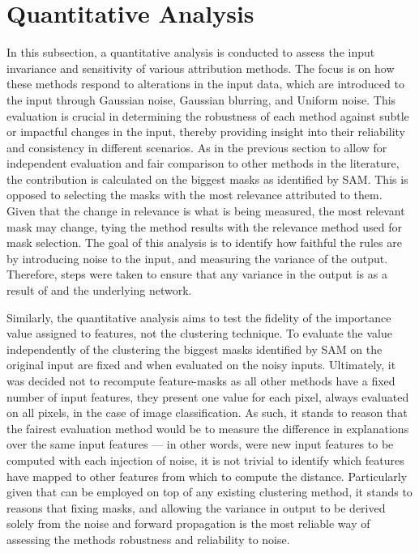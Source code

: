 \section{Quantitative Analysis}
In this subsection, a quantitative analysis is conducted to assess the input invariance and sensitivity of various attribution methods. The focus is on how these methods respond to alterations in the input data, which are introduced to the input through Gaussian noise, Gaussian blurring, and Uniform noise. This evaluation is crucial in determining the robustness of each method against subtle or impactful changes in the input, thereby providing insight into their reliability and consistency in different scenarios. As in the previous section to allow for independent evaluation and fair comparison to other methods in the literature, the contribution is calculated on the biggest masks as identified by SAM. This is opposed to selecting the masks with the most relevance attributed to them. Given that the change in relevance is what is being measured, the most relevant mask may change, tying the \CTC\/ method results with the relevance method used for mask selection. The goal of this analysis is to identify how faithful the \CTC\/ rules are by introducing noise to the input, and measuring the variance of the output. Therefore, steps were taken to ensure that any variance in the output is as a result of \CTC\/ and the underlying network.


Similarly, the quantitative analysis aims to test the fidelity of the importance value assigned to features, not the clustering technique. To evaluate the \CTC\/ value independently of the clustering the biggest masks identified by SAM on the original input are fixed and when evaluated on the noisy inputs. Ultimately, it was decided not to recompute feature-masks as all other methods have a fixed number of input features, they present one value for each pixel, always evaluated on all pixels, in the case of image classification. As such, it stands to reason that the fairest evaluation method would be to measure the difference in explanations over the same input features --- in other words, were new input features to be computed with each injection of noise, it is not trivial to identify which features have mapped to other features from which to compute the distance. Particularly given that \CTC\/ can be employed on top of any existing clustering method, it stands to reasons that fixing masks, and allowing the variance in output to be derived solely from the noise and forward propagation is the most reliable way of assessing the methods robustness and reliability to noise. 

